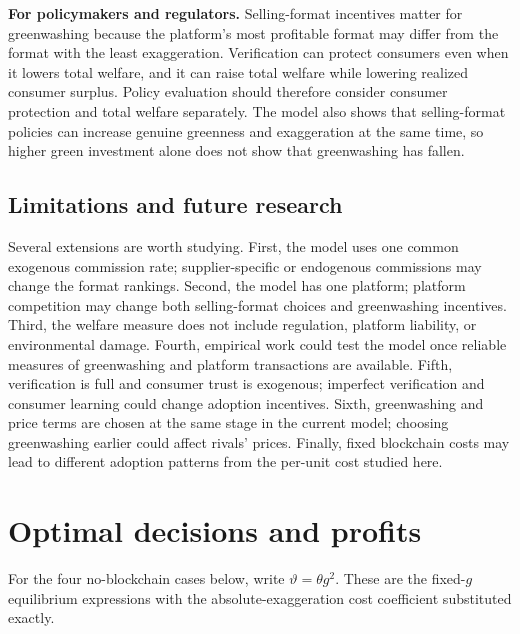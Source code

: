 \documentclass[preprint,review,12pt,authoryear,nopreprintline]{elsarticle}
\theoremstyle{definition}
\begin{document}
\textbf{For policymakers and regulators.} Selling-format incentives matter for greenwashing because the platform's most profitable format may differ from the format with the least exaggeration. Verification can protect consumers even when it lowers total welfare, and it can raise total welfare while lowering realized consumer surplus. Policy evaluation should therefore consider consumer protection and total welfare separately. The model also shows that selling-format policies can increase genuine greenness and exaggeration at the same time, so higher green investment alone does not show that greenwashing has fallen.

\subsection{Limitations and future research}

Several extensions are worth studying. First, the model uses one common exogenous commission rate; supplier-specific or endogenous commissions may change the format rankings. Second, the model has one platform; platform competition may change both selling-format choices and greenwashing incentives. Third, the welfare measure does not include regulation, platform liability, or environmental damage. Fourth, empirical work could test the model once reliable measures of greenwashing and platform transactions are available. Fifth, verification is full and consumer trust is exogenous; imperfect verification and consumer learning could change adoption incentives. Sixth, greenwashing and price terms are chosen at the same stage in the current model; choosing greenwashing earlier could affect rivals' prices. Finally, fixed blockchain costs may lead to different adoption patterns from the per-unit cost studied here.

\appendix
\section{Optimal decisions and profits}\label{app:A}
\begingroup\small

For the four no-blockchain cases below, write $\vartheta=\theta g^2$. These are the fixed-$g$ equilibrium expressions with the absolute-exaggeration cost coefficient substituted exactly.
\end{document}
